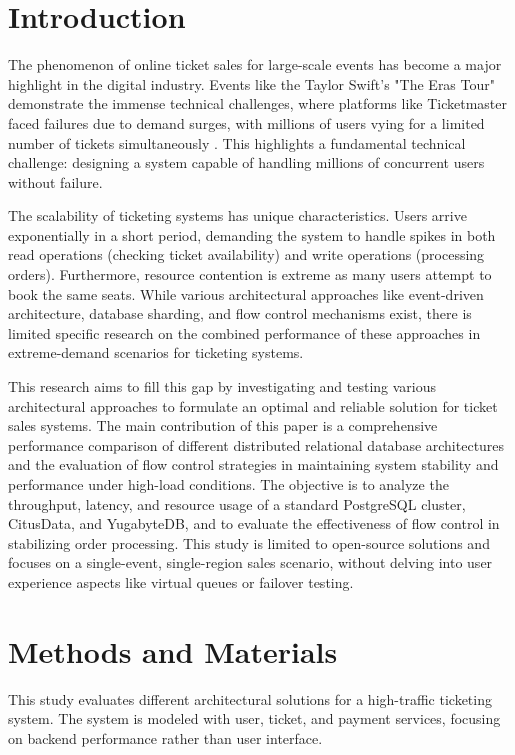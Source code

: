 \section{Introduction}
\label{sec:introduction}

The phenomenon of online ticket sales for large-scale events has become a major highlight in the digital industry. Events like the Taylor Swift's "The Eras Tour" demonstrate the immense technical challenges, where platforms like Ticketmaster faced failures due to demand surges, with millions of users vying for a limited number of tickets simultaneously \cite{swiftTicketmaster}. This highlights a fundamental technical challenge: designing a system capable of handling millions of concurrent users without failure.

The scalability of ticketing systems has unique characteristics. Users arrive exponentially in a short period, demanding the system to handle spikes in both read operations (checking ticket availability) and write operations (processing orders). Furthermore, resource contention is extreme as many users attempt to book the same seats. While various architectural approaches like event-driven architecture, database sharding, and flow control mechanisms exist, there is limited specific research on the combined performance of these approaches in extreme-demand scenarios for ticketing systems.

This research aims to fill this gap by investigating and testing various architectural approaches to formulate an optimal and reliable solution for ticket sales systems. The main contribution of this paper is a comprehensive performance comparison of different distributed relational database architectures and the evaluation of flow control strategies in maintaining system stability and performance under high-load conditions. The objective is to analyze the throughput, latency, and resource usage of a standard PostgreSQL cluster, CitusData, and YugabyteDB, and to evaluate the effectiveness of flow control in stabilizing order processing. This study is limited to open-source solutions and focuses on a single-event, single-region sales scenario, without delving into user experience aspects like virtual queues or failover testing.




\section{Methods and Materials}
\label{sec:methods}
This study evaluates different architectural solutions for a high-traffic ticketing system. The system is modeled with user, ticket, and payment services, focusing on backend performance rather than user interface.

